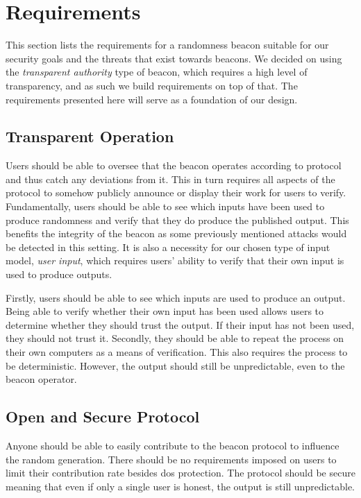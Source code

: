 \section{Requirements}%
\label{sec:beacon_requirements}
This section lists the requirements for a randomness beacon suitable for our security goals and the threats that exist towards beacons.
We decided on using the \emph{transparent authority} type of beacon, which requires a high level of transparency, and as such we build requirements on top of that.
The requirements presented here will serve as a foundation of our design.

\subsection{Transparent Operation}\label{sec:transparent_operation}
Users should be able to oversee that the beacon operates according to protocol and thus catch any deviations from it.
This in turn requires all aspects of the protocol to somehow publicly announce or display their work for users to verify.
Fundamentally, users should be able to see which inputs have been used to produce randomness and verify that they do produce the published output.
This benefits the integrity of the beacon as some previously mentioned attacks would be detected in this setting.
It is also a necessity for our chosen type of input model, \emph{user input}, which requires users' ability to verify that their own input is used to produce outputs.

Firstly, users should be able to see which inputs are used to produce an output.
Being able to verify whether their own input has been used allows users to determine whether they should trust the output.
If their input has not been used, they should not trust it.
Secondly, they should be able to repeat the process on their own computers as a means of verification.
This also requires the process to be deterministic.
However, the output should still be unpredictable, even to the beacon operator.

\subsection{Open and Secure Protocol}\label{sec:open_and_secure_protocol}
Anyone should be able to easily contribute to the beacon protocol to influence the random generation.
There should be no requirements imposed on users to limit their contribution rate besides \gls{dos} protection.
The protocol should be secure meaning that even if only a single user is honest, the output is still unpredictable.

